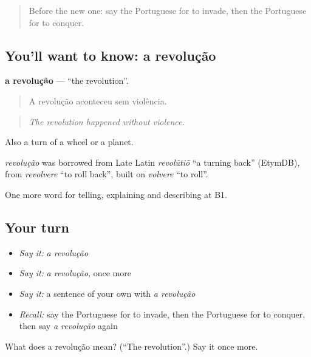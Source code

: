 \label{lesson:PT-C329-revolucao}



\begin{quote}
Before the new one: say the Portuguese for to invade, then the Portuguese for to conquer.
\end{quote}

\subsection*{You'll want to know: a revolução}
\textbf{a revolução} — \textquotedblleft{}the revolution\textquotedblright{}.

\begin{quote}
A revolução aconteceu sem violência.
\end{quote}

\begin{quote}
\emph{The revolution happened without violence.}
\end{quote}

Also a turn of a wheel or a planet.

\begin{cousinweb}
\emph{revolução} was borrowed from Late Latin \emph{revolūtiō} \textquotedblleft{}a turning back\textquotedblright{} (EtymDB), from \emph{revolvere} \textquotedblleft{}to roll back\textquotedblright{}, built on \emph{volvere} \textquotedblleft{}to roll\textquotedblright{}.
\end{cousinweb}

\begin{grammarlens}[title={What you've built}]
One more word for telling, explaining and describing at B1.
\end{grammarlens}

\subsection*{Your turn}
\begin{itemize}
\raggedright
  \item \emph{Say it:} \emph{a revolução}
  \item \emph{Say it:} \emph{a revolução}, once more
  \item \emph{Say it:} a sentence of your own with \emph{a revolução}
  \item \emph{Recall:} say the Portuguese for to invade, then the Portuguese for to conquer, then say \emph{a revolução} again
\end{itemize}

\begin{tcolorbox}[breakable,colback=teal!4,colframe=teal!35!black,title={Before you move on}]
What does a revolução mean? (\textquotedblleft{}The revolution\textquotedblright{}.) Say it once more.
\end{tcolorbox}
